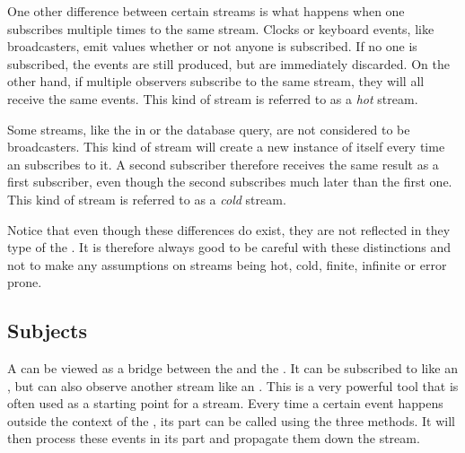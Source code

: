 
One other difference between certain streams is what happens when one subscribes multiple times to the same stream. Clocks or keyboard events, like broadcasters, emit values whether or not anyone is subscribed. If no one is subscribed, the events are still produced, but are immediately discarded. On the other hand, if multiple observers subscribe to the same stream, they will all receive the same events. This kind of stream is referred to as a \textit{hot} stream.

Some streams, like the  in  or the database query, are not considered to be broadcasters. This kind of stream will create a new instance of itself every time an \obv subscribes to it. A second subscriber therefore receives the same result as a first subscriber, even though the second subscribes much later than the first one. This kind of stream is referred to as a \textit{cold} stream.


Notice that even though these differences do exist, they are not reflected in they type of the \obs. It is therefore always good to be careful with these distinctions and not to make any assumptions on streams being hot, cold, finite, infinite or error prone.

\subsection{Subjects}
\label{subsec:subjects}
A \subj can be viewed as a bridge between the \obv and the \obs. It can be subscribed to like an \obs, but can also observe another stream like an \obv. This is a very powerful tool that is often used as a starting point for a stream. Every time a certain event happens outside the context of the \subj, its \obv part can be called using the three methods. It will then process these events in its \obs part and propagate them down the stream.

